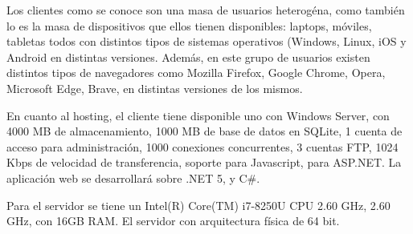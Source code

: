 Los clientes como se conoce son una masa de usuarios heterogéna, como también lo es la masa de dispositivos que ellos tienen disponibles: laptops, móviles, tabletas todos con distintos tipos de sistemas operativos (Windows, Linux, iOS y Android en distintas versiones. Además, en este grupo de usuarios existen distintos tipos de navegadores como Mozilla Firefox, Google Chrome, Opera, Microsoft Edge, Brave, en distintas versiones de los mismos.

En cuanto al hosting, el cliente tiene disponible uno con Windows Server, con 4000 MB de almacenamiento, 1000 MB de base de datos en SQLite, 1 cuenta de acceso para administración, 1000 conexiones concurrentes, 3 cuentas FTP, 1024 Kbps de velocidad de transferencia, soporte para Javascript, para ASP.NET. La aplicación web se desarrollará sobre .NET 5, y C\#.

Para el servidor se tiene un Intel(R) Core(TM) i7-8250U CPU 2.60 GHz, 2.60 GHz, con 16GB RAM. El servidor con arquitectura física de 64 bit.
